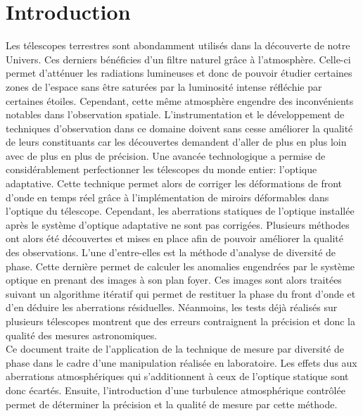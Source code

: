 \chapter{Introduction} \label{chap:intro}
Les télescopes terrestres sont abondamment utilisés dans la découverte de notre Univers. Ces derniers bénéficies d'un filtre naturel grâce à l'atmosphère. Celle-ci permet d'atténuer les radiations lumineuses et donc de pouvoir étudier certaines zones de l'espace sans être saturées par la luminosité intense réfléchie par certaines étoiles. Cependant, cette même atmosphère engendre des inconvénients notables dans l'observation spatiale. L'instrumentation et le développement de techniques d'observation dans ce domaine doivent sans cesse améliorer la qualité de leurs constituants car les découvertes demandent d'aller de plus en plus loin avec de plus en plus de précision. Une avancée technologique a permise de considérablement perfectionner les télescopes du monde entier: l'optique adaptative. Cette technique permet alors de corriger les déformations de front d'onde en temps réel grâce à l'implémentation de miroirs déformables dans l'optique du télescope. Cependant, les aberrations statiques de l'optique installée après le système d'optique adaptative ne sont pas corrigées. Plusieurs méthodes ont alors été découvertes et mises en place afin de pouvoir améliorer la qualité des observations. L'une d'entre-elles est la méthode d'analyse de diversité de phase. Cette dernière permet de calculer les anomalies engendrées par le système optique en prenant des images à son plan foyer. Ces images sont alors traitées suivant un algorithme itératif qui permet de restituer la phase du front d'onde et d'en déduire les aberrations résiduelles. Néanmoins, les tests déjà réalisés sur plusieurs télescopes montrent que des erreurs contraignent la précision et donc la qualité des mesures astronomiques.\\

Ce document traite de l'application de la technique de mesure par diversité de phase dans le cadre d'une manipulation réalisée en laboratoire. Les effets dus aux aberrations atmosphériques qui s'additionnent à ceux de l'optique statique sont donc écartés. Ensuite, l'introduction d'une turbulence atmosphérique contrôlée permet de déterminer la précision et la qualité de mesure par cette méthode.\\

